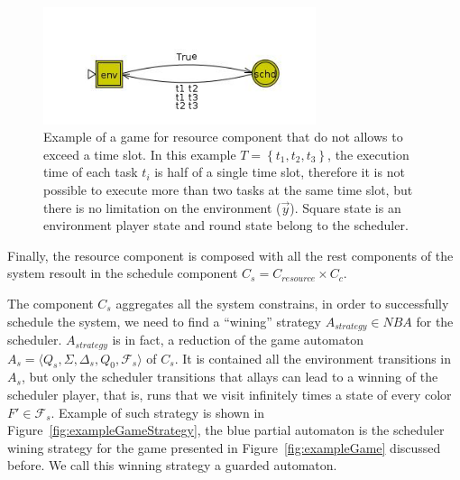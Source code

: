 \documentclass[ twoside, 12pt ]{article}
\begin{document}
\begin{figure} [h]
    \centerline{\includegraphics[width=80mm]{reasourceGame.jpg}}
    \caption{Example of a game for resource component that do not allows to exceed a time slot. 
        In this example $T = \left\{ t_1 , t_2 , t_3 \right\}$, the execution time of each task $t_i$ is half of a single time slot, therefore it is not possible to execute more than two tasks at the same time slot, but there is no limitation on the environment ($\vec{y}$).
        Square state is an environment player state and round state belong to the scheduler.  }
    \label{fig:C_resource}
\end{figure}

Finally, the resource component is composed with all the rest components of the system resoult in the schedule component $C_s = C_{resource} \times C_c$.

The component $C_s$ aggregates all the system constrains, in order to successfully schedule the system, we need to find a ``wining'' strategy $A_{strategy} \in NBA$ for the scheduler.
$A_{strategy}$ is in fact, a reduction of the game automaton $A_s = \langle Q_s ,\Sigma,\Delta_s, Q_0, \mathcal{F}_s \rangle$ of $C_s$. It is contained all the environment transitions in $A_s$, but only the scheduler transitions that allays can lead to a winning of the scheduler player, that is, runs that we visit infinitely times a state of every color $F' \in \mathcal{F}_s$.
Example of such strategy is shown in Figure~\ref{fig:exampleGameStrategy}, the blue partial automaton is the scheduler wining strategy for the game presented in Figure~\ref{fig:exampleGame} discussed before.
We call this winning strategy a guarded automaton.
\end{document}

